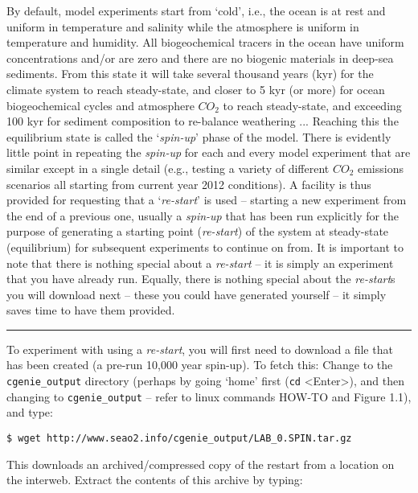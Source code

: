 \documentclass[11pt,fleqn]{book} %
\begin{document}
By default, model experiments start from ‘cold’, i.e., the ocean is at rest and uniform in temperature and salinity while the atmosphere is uniform in temperature and humidity. All biogeochemical tracers in the ocean have uniform concentrations and/or are zero and there are no biogenic materials in deep-sea sediments. From this state it will take several thousand years (kyr) for the climate system to reach steady-state, and closer to 5 kyr (or more) for ocean biogeochemical cycles and atmosphere \(CO_{2}\) to reach steady-state, and exceeding 100 kyr for sediment composition to re-balance weathering ... Reaching this the equilibrium state is called the ‘\textit{spin-up}’ phase of the model.
There is evidently little point in repeating the \textit{spin-up} for each and every model experiment that are similar except in a single detail (e.g., testing a variety of different \(CO_{2}\) emissions scenarios all starting from current year 2012 conditions). A facility is thus provided for requesting that a ‘\textit{re-start}’ is used – starting a new experiment from the end of a previous one, usually a \textit{spin-up} that has been run explicitly for the purpose of generating a starting point (\textit{re-start}) of the system at steady-state (equilibrium) for subsequent experiments to continue on from.
It is important to note that there is nothing special about a \textit{re-start} – it is simply an experiment that you have already run. Equally, there is nothing special about the \textit{re-start}s you will download next – these you could have generated yourself – it simply saves time to have them provided.

\vspace{1mm}
\noindent\rule{4cm}{0.1mm}
\vspace{2mm}

\noindent To experiment with using a \textit{re-start}, you will first need to download a file that has been created (a pre-run 10,000 year spin-up). To fetch this: Change to the \texttt{cgenie\_output} directory (perhaps by going ‘home’ first (\texttt{cd} \textsf{<Enter>}), and then changing to \texttt{cgenie\_output} – refer to linux commands HOW-TO and Figure 1.1), and type:

\vspace{-2mm}
\begin{verbatim}
$ wget http://www.seao2.info/cgenie_output/LAB_0.SPIN.tar.gz
\end{verbatim}
\vspace{-2mm}

This downloads an archived/compressed copy of the restart from a location on the interweb. Extract the contents of this archive by typing:
\end{document}
